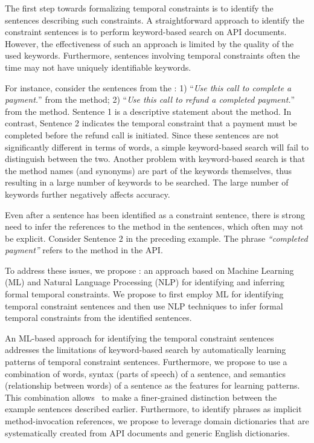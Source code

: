The first step towards formalizing temporal constraints is to identify the sentences describing such constraints.
A straightforward approach to identify the constraint sentences is to perform keyword-based search on API documents.
However, the effectiveness of such an approach is limited by the quality of the used keywords.
Furthermore, sentences involving temporal constraints often the time may not have uniquely identifiable keywords.

For instance, consider the sentences from the \paypalAPI:
1) ``\textit{Use this call to complete a payment.}'' from the  method;
2) ``\textit{Use this call to refund a completed payment.}'' from the  method.
Sentence 1 is a descriptive statement about the  method.
In contrast, Sentence 2 indicates the temporal constraint that a payment must be completed before the refund call is initiated.
Since these sentences are not significantly different in terms of words, a simple keyword-based search will fail to distinguish between the two. 
Another problem with keyword-based search is that the method names (and synonyms) are part of the keywords themselves, thus resulting in a large number of keywords to be searched.
The large number of keywords further negatively affects accuracy.

Even after a sentence has been identified as a constraint sentence, there is strong need to infer the references to the method in the sentences, which often may not be explicit. Consider Sentence 2 in the preceding example. The phrase \textit{``completed payment''} refers to the  method in the API.

To address these issues, we propose \tool: an approach based on Machine Learning (ML) and Natural Language Processing (NLP)
for identifying and inferring formal temporal constraints.
We propose to first employ ML for identifying temporal constraint sentences and then use NLP techniques to infer formal temporal constraints from the identified sentences. 

An ML-based approach for identifying the temporal constraint sentences addresses the limitations of keyword-based search by automatically learning patterns of temporal constraint sentences.
Furthermore, we propose to use a combination of words, syntax (parts of speech) of a sentence, and semantics (relationship between words) of a sentence as the features for learning patterns.
This combination allows \tool\ to make a finer-grained distinction between the example sentences described earlier.
Furthermore, to identify phrases as implicit method-invocation references, we propose to leverage domain dictionaries that are systematically created from API documents and generic English dictionaries.

